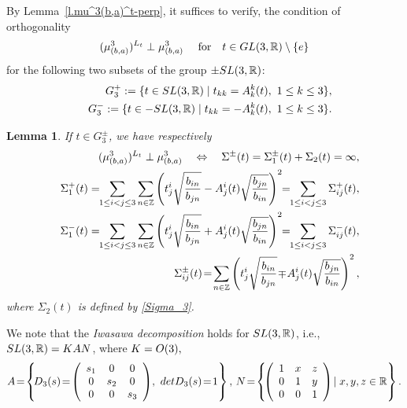 \documentclass[preprint,12pt]{elsarticle}
\newcommand{\commA}[1]{\marginpar{%
\begin{color}{red}
\vskip-\baselineskip %
\raggedright\footnotesize
\itshape\hrule \smallskip A: #1\par\smallskip\hrule\end{color}}}
\newtheorem{lem}[thm]{Lemma}
\numberwithin{equation}{section}
\begin{document}
\begin{rem}
\label{r.pm-SL(3)}
By Lemma~\ref{l.mu^3(b,a)^t-perp}, it suffices to verify, the condition  of orthogonality 
\begin{equation*}
 (\mu_{(b,a)}^3)^{L_t}\perp\mu_{(b,a)}^3\quad
\text{ for}\quad t\in {\rm GL}(3,{\mathbb R})\setminus\{e\}
\end{equation*}
for the following two subsets 
of the group 
$\pm{\rm SL}(3,\mathbb R)$:
\begin{eqnarray}
 \label{G_3^+}
&&G_3^+:=\{t\in {\rm SL}(3,\mathbb R)\mid t_{kk}= A^k_k(t),\,\,1\leq k\leq 3\},\\
 \label{G_3^-}
&&G_3^-:=\{t\in -{\rm SL}(3,\mathbb R)\mid t_{kk}= -A^k_k(t),\,\,1\leq k\leq 3\}.
\end{eqnarray}
\end{rem}
\begin{lem}
%
\label{l.SL(3)-perp}
If $t\in G_3^\pm $, we have respectively 
\begin{eqnarray}
\nonumber
&&(\mu_{(b,a)}^3)^{L_t}\perp\mu_{(b,a)}^3\quad\Leftrightarrow\quad\Sigma^\pm(t)=\Sigma_1^\pm(t)+
\Sigma_2(t)=\infty,\\
%
\label{Sigma_1^+(t).m=3}
 &&\Sigma_1^+(t)=\!\!\sum_{1\leq i< j\leq 3}\sum_{n\in \mathbb Z}\left(t^i_j\sqrt{\frac{b_{in}}{b_{jn}}} -A^i_j(t)\sqrt{\frac{b_{jn}}{b_{in}}}\right)^2\!\!=\!\!\sum_{1\leq i<j\leq 3}\Sigma^+_{ij}(t),\\
 \label{Sigma_1^{-}(t).m=3}
&&\Sigma_1^{-}(t)=\!\! \sum_{1\leq i< j\leq 3}\sum_{n\in \mathbb Z}\left(t^i_j\sqrt{\frac{b_{in}}{b_{jn}}} +A^i_j(t)\sqrt{\frac{b_{jn}}{b_{in}}}\right)^2\!\!=\!\!\sum_{1\leq i< j\leq 3}\Sigma^{-}_{ij}(t),\\
%
\label{Sigma(pm)(ij)}
&&
\Sigma^\pm_{ij}(t)\!=\!\sum_{n\in \mathbb Z}\left(t^i_j\sqrt{\frac{b_{in}}{b_{jn}}}\! \mp\!A^i_j(t)\sqrt{\frac{b_{jn}}{b_{in}}}\right)^2,
\end{eqnarray}
%
where $\Sigma_2(t)$ is defined by \eqref{Sigma_3}.
\end{lem}
%
\begin{rem}
\label{r.conj.m=3}
We note that the {\it Iwasawa decomposition} holds for ${\rm SL}(3,{\mathbb R})$, i.e.,
${\rm SL}(3,{\mathbb R})=KAN$,  where $K={\rm O}(3),$
%
{\small
\begin{equation}
\label{A,N.m=3} 
A\!=\!\left\{\!D_3(s)\!=\!\left(\begin{array}{ccc}
 s_1&0&0\\
  0&s_2&0\\
  0&0&s_3
\end{array}\right)\!,\,\,{\rm det}D_3(s)\!=\!1\right\},\,N\!=\!\left\{\!\left(\begin{array}{ccc}
 1&x&z\\
  0&1&y\\
  0&0&1
\end{array}\right)\!\mid x,y,z\in \mathbb R\right\}.
\end{equation}
}
\end{rem}
\end{document}
